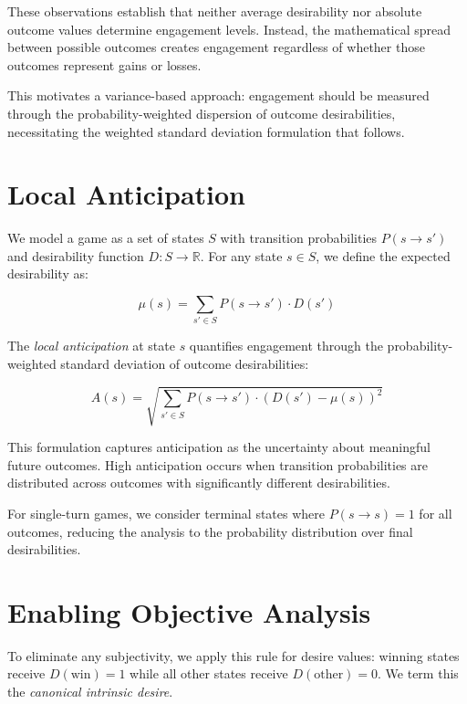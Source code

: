\documentclass{article}
\begin{document}
These observations establish that neither average desirability nor absolute outcome values determine engagement levels. Instead, the mathematical spread between possible outcomes creates engagement regardless of whether those outcomes represent gains or losses.

This motivates a variance-based approach: engagement should be measured through the probability-weighted dispersion of outcome desirabilities, necessitating the weighted standard deviation formulation that follows.

\section{Local Anticipation}

We model a game as a set of states $S$ with transition probabilities $P(s \to s')$ and desirability function $D: S \to \mathbb{R}$. For any state $s \in S$, we define the expected desirability as:

\begin{equation}
\mu(s) = \sum_{s' \in S} P(s \to s') \cdot D(s')
\end{equation}

The \emph{local anticipation} at state $s$ quantifies engagement through the probability-weighted standard deviation of outcome desirabilities:

\begin{equation}
A(s) = \sqrt{\sum_{s' \in S} P(s \to s') \cdot (D(s') - \mu(s))^2}
\end{equation}

This formulation captures anticipation as the uncertainty about meaningful future outcomes. High anticipation occurs when transition probabilities are distributed across outcomes with significantly different desirabilities.

For single-turn games, we consider terminal states where $P(s \to s) = 1$ for all outcomes, reducing the analysis to the probability distribution over final desirabilities.

\section{Enabling Objective Analysis}

To eliminate any subjectivity, we apply this rule for desire values: winning states receive $D(\text{win}) = 1$ while all other states receive $D(\text{other}) = 0$.
We term this the \emph{canonical intrinsic desire}.
\end{document}

